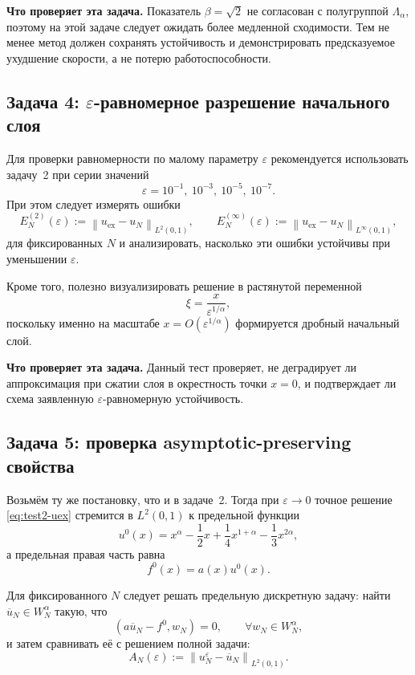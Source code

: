 \documentclass[12pt,a4paper]{article}
\theoremstyle{definition}
\newcommand{\eps}{\varepsilon}
\newcommand{\inner}[2]{\left(#1,#2\right)}
\newcommand{\norm}[1]{\left\lVert #1 \right\rVert}
\begin{document}
\medskip
\noindent
\textbf{Что проверяет эта задача.}
Показатель $\beta=\sqrt2$ не согласован с полугруппой $\Lambda_\alpha$,
поэтому на этой задаче следует ожидать более медленной сходимости.
Тем не менее метод должен сохранять устойчивость и демонстрировать
предсказуемое ухудшение скорости, а не потерю работоспособности.

\subsection{Задача 4: \texorpdfstring{$\eps$}{eps}-равномерное разрешение начального слоя}

Для проверки равномерности по малому параметру $\eps$ рекомендуется использовать задачу~2
при серии значений
\[
\eps=10^{-1},\ 10^{-3},\ 10^{-5},\ 10^{-7}.
\]
При этом следует измерять ошибки
\[
E_N^{(2)}(\eps):=\norm{u_{\mathrm{ex}}-u_N}_{L^2(0,1)},
\qquad
E_N^{(\infty)}(\eps):=\norm{u_{\mathrm{ex}}-u_N}_{L^\infty(0,1)},
\]
для фиксированных $N$ и анализировать, насколько эти ошибки устойчивы
при уменьшении $\eps$.

Кроме того, полезно визуализировать решение в растянутой переменной
\[
\xi=\frac{x}{\eps^{1/\alpha}},
\]
поскольку именно на масштабе $x=O(\eps^{1/\alpha})$ формируется дробный начальный слой.

\medskip
\noindent
\textbf{Что проверяет эта задача.}
Данный тест проверяет, не деградирует ли аппроксимация при сжатии слоя
в окрестность точки $x=0$, и подтверждает ли схема заявленную
$\eps$-равномерную устойчивость.

\subsection{Задача 5: проверка asymptotic-preserving свойства}

Возьмём ту же постановку, что и в задаче~2. Тогда при $\eps\to0$ точное решение
\eqref{eq:test2-uex} стремится в $L^2(0,1)$ к предельной функции
\begin{equation}
\label{eq:test5-u0}
u^{0}(x)
=
x^\alpha
-\frac12 x
+\frac14 x^{1+\alpha}
-\frac13 x^{2\alpha},
\end{equation}
а предельная правая часть равна
\begin{equation}
\label{eq:test5-f0}
f^{0}(x)=a(x)u^0(x).
\end{equation}

Для фиксированного $N$ следует решать предельную дискретную задачу:
найти $\overline u_N\in W_N^\alpha$ такую, что
\begin{equation}
\label{eq:test5-limit-discrete}
\inner{a\overline u_N-f^0}{w_N}=0,
\qquad \forall w_N\in W_N^\alpha,
\end{equation}
и затем сравнивать её с решением полной задачи:
\begin{equation}
\label{eq:test5-AP-error}
A_N(\eps):=\norm{u_N^\eps-\overline u_N}_{L^2(0,1)}.
\end{equation}
\end{document}
